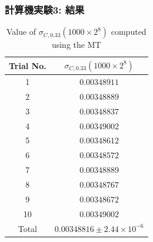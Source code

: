 \documentclass[dvipdfmx,11pt]{beamer}
\begin{document}
\begin{frame}[c]\frametitle{計算機実験3: 結果}
\begin{table}[tbp]
  \centering
  \caption{Value of $\sigma_{C,0.33}(1000\times 2^8)$ computed using the MT}
  \begin{tabular}{cc} \hline
    Trial No.   & $\sigma_{C,0.33}(1000\times 2^8)$           \\ \hline 
    1           & $0.00348911$       \\
    2           & $0.00348889$       \\
    3           & $0.00348837$       \\ 
    4           & $0.00349002$       \\ 
    5           & $0.00348612$       \\ 
    6           & $0.00348572$       \\ 
    7           & $0.00348889$       \\ 
    8           & $0.00348767$       \\ 
    9           & $0.00348672$       \\ 
    10          & $0.00349002$       \\ \hline 
    Total       & $0.00348816 \pm 2.44 \times 10^{-6}$ \\ \hline
  \end{tabular}
\end{table}
\end{frame}
\end{document}
